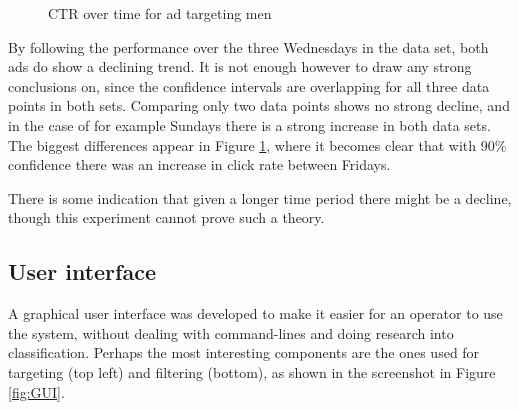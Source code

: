 \documentclass{sig-alternate}
\begin{document}
\begin{figure}[htb]
\begin{center}

	\caption{CTR over time for ad targeting men}
	\label{fig:TimeInfluence2}
\end{center}
\end{figure}

By following the performance over the three Wednesdays in the data set, both ads do show a declining trend. It is not enough however to draw any strong conclusions on, since the confidence intervals are overlapping for all three data points in both sets. Comparing only two data points shows no strong decline, and in the case of for example Sundays there is a strong increase in both data sets. The biggest differences appear in Figure \ref{fig:TimeInfluence2}, where it becomes clear that with 90\% confidence there was an increase in click rate between Fridays.

There is some indication that given a longer time period there might be a decline, though this experiment cannot prove such a theory.

\subsection{User interface}
A graphical user interface was developed to make it easier for an operator to use the system, without dealing with command-lines and doing research into classification. Perhaps the most interesting components are the ones used for targeting (top left) and filtering (bottom), as shown in the screenshot in Figure \ref{fig:GUI}.
\end{document}
